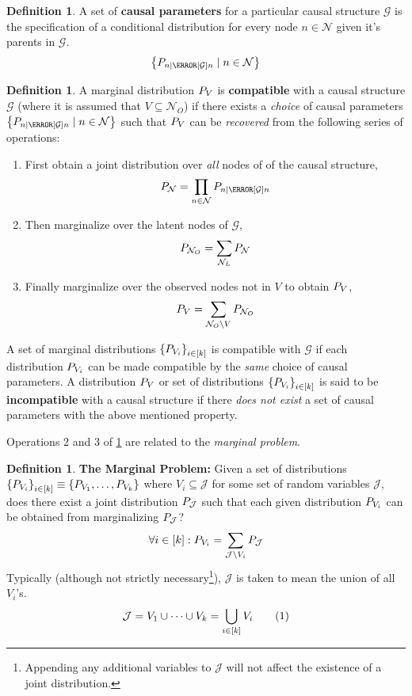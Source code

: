 \documentclass[aps, 10pt, english, twoside, pra, nofootinbib, longbibliography]{revtex4-1}
\theoremstyle{plain}
\theoremstyle{definition}
\newtheorem{definition}[theorem]{Definition}
\theoremstyle{remark}
\newcommand{\graph}{\mathcal{G}}
\newcommand{\nodes}{\mathcal{N}}
\newcommand{\jointvar}{\mathcal{J}}
\newcommand{\term}[1]{\textcolor{Mahogany}{\textbf{#1}}}
\begin{document}
    \begin{definition}
        A set of \term{causal parameters} for a particular causal structure $\graph$ is the specification of a conditional distribution for every node $n \in \nodes$ given it's parents in $\graph$.
        \[ \bc{\prob[n \mid \Pa[\graph]{n}] \mid n \in \nodes} \]
    \end{definition}
    \begin{definition}
        \label{def:compatible}
        A marginal distribution $\prob[V]$ is \term{compatible} with a causal structure $\graph$ (where it is assumed that $V \subseteq \nodes_O$) if there exists a \textit{choice} of causal parameters $\bc{\prob[n \mid \Pa[\graph]{n}] \mid n \in \nodes}$ such that $\prob[V]$ can be \textit{recovered} from the following series of operations:
        \begin{enumerate}
            \item First obtain a joint distribution over \textit{all} nodes of of the causal structure,
            \[ \prob[\nodes] = \prod_{n \in \nodes} \prob[n \mid \Pa[\graph]{n}] \]
            \item Then marginalize over the latent nodes of $\graph$,
            \[ \prob[\nodes_O] = \sum_{\nodes_L} \prob[\nodes] \]
            \item Finally marginalize over the observed nodes not in $V$ to obtain $\prob[V]$,
            \[ \prob[V] = \sum_{\nodes_O \setminus V} \prob[\nodes_O] \]
        \end{enumerate}
        A set of marginal distributions $\bc{\prob[V_{i}]}_{i \in \bs{k}}$ is compatible with $\graph$ if each distribution $\prob[V_{i}]$ can be made compatible by the \textit{same} choice of causal parameters.
        A distribution $\prob[V]$ or set of distributions $\bc{\prob[V_{i}]}_{i \in \bs{k}}$ is said to be \term{incompatible} with a causal structure if there \textit{does not exist} a set of causal parameters with the above mentioned property.

    \end{definition}
    Operations 2 and 3 of \cref{def:compatible} are related to the \textit{marginal problem}.
    \begin{definition}
        \label{def:marginal_problem}
        \term{The Marginal Problem:} Given a set of distributions $\bc{\prob[V_{i}]}_{i \in \bs{k}} \defined \bc{\prob[V_1], \ldots, \prob[V_k]}$ where $V_i \subseteq \jointvar$ for some set of random variables $\jointvar$, does there exist a joint distribution $\prob[\jointvar]$ such that each given distribution $\prob[V_i]$ can be obtained from marginalizing $\prob[\jointvar]$?
        \[ \forall i \in \bs{k} : \prob[V_i] = \sum_{\jointvar \setminus V_i} \prob[\jointvar] \]
        Typically (although not strictly necessary\footnote{Appending any additional variables to $\jointvar$ will not affect the existence of a joint distribution.}), $\jointvar$ is taken to mean the union of all $V_i$'s.
        \[ \jointvar = V_1 \cup \cdots \cup V_k = \bigcup_{i\in\bs{k}} V_i \eq \label{eq:marginals_union} \]
    \end{definition}
\end{document}
